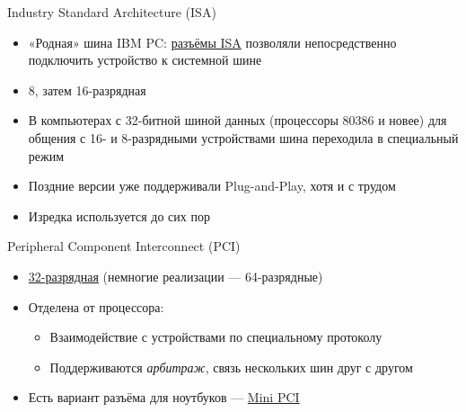 \documentclass[xetex,aspectratio=43]{beamer}
\begin{document}
\begin{frame}{Industry Standard Architecture (ISA)}
    \begin{itemize}
        \item «Родная» шина IBM PC: \href{https://en.wikipedia.org/wiki/Industry_Standard_Architecture}{разъёмы ISA} позволяли непосредственно подключить устройство к системной шине
        \item 8, затем 16-разрядная
        \item В компьютерах с 32-битной шиной данных (процессоры 80386 и новее) для общения с 16- и 8-разрядными устройствами шина переходила в специальный режим
        \item Поздние версии уже поддерживали Plug-and-Play, хотя и с трудом
        \pause
        \item Изредка используется до сих пор
    \end{itemize}
\end{frame}


\begin{frame}{Peripheral Component Interconnect (PCI)}
    \begin{itemize}
        \item \href{https://en.wikipedia.org/wiki/Peripheral_Component_Interconnect}{32-разрядная} (немногие реализации --- 64-разрядные)
        \item \alert<2->{Отделена от процессора:}
        \begin{itemize}
            \item Взаимодействие с устройствами по специальному протоколу
            \item Поддерживаются \emph{арбитраж}, связь нескольких шин друг с другом
        \end{itemize}
    \pause
    \item Есть вариант разъёма для ноутбуков --- \href{https://en.wikipedia.org/wiki/Peripheral\_Component\_Interconnect\#Mini_PCI}{Mini PCI}
    \end{itemize}
\end{frame}
\end{document}
